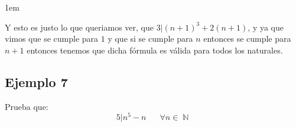 \documentclass[12pt, fleqn]{report}                             %
\newenvironment{SmallIndentation}[1][0.75em]                    %
        {\begin{adjustwidth}{#1}{}\begin{footnotesize}}             %
        {\end{footnotesize}\end{adjustwidth}}                       %
\DeclareMathOperator \Space     {\quad}                         %
\theoremstyle{break}                                            %
\DeclareMathOperator \Naturals     {\mathbb{N}}                 %
\begin{document}
\begin{SmallIndentation}[1em]
\begin{itemize}
                        Y esto es justo lo que queriamos ver, que $3 | (n+1)^3 + 2(n+1)$, y ya que vimos que se cumple
                        para $1$ y que si se cumple para $n$ entonces se cumple para $n+1$ entonces
                        tenemos que dicha fórmula es válida para todos los naturales.
                        
                    \end{itemize}

                \end{SmallIndentation}


            \clearpage
            \subsection*{Ejemplo 7}

                Prueba que:
                \begin{equation*}
                    5 | n^5 - n
                    \Space \forall n \in \Naturals 
                \end{equation*}
\end{document}
